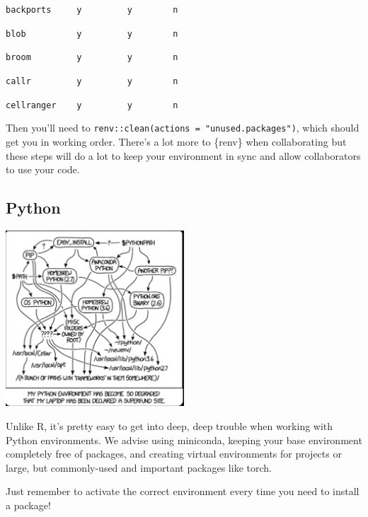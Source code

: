 \documentclass[
  letterpaper,
  DIV=11,
  numbers=noendperiod]{scrreprt}
\begin{document}
\begin{tcolorbox}
\texttt{backports\ \ \ \ \ y\ \ \ \ \ \ \ \ \ y\ \ \ \ \ \ \ \ n}

\texttt{blob\ \ \ \ \ \ \ \ \ \ y\ \ \ \ \ \ \ \ \ y\ \ \ \ \ \ \ \ n}

\texttt{broom\ \ \ \ \ \ \ \ \ y\ \ \ \ \ \ \ \ \ y\ \ \ \ \ \ \ \ n}

\texttt{callr\ \ \ \ \ \ \ \ \ y\ \ \ \ \ \ \ \ \ y\ \ \ \ \ \ \ \ n}

\texttt{cellranger\ \ \ \ y\ \ \ \ \ \ \ \ \ y\ \ \ \ \ \ \ \ n}

Then you'll need to \texttt{renv::clean(actions\ =\ "unused.packages")},
which should get you in working order. There's a lot more to \{renv\}
when collaborating but these steps will do a lot to keep your
environment in sync and allow collaborators to use your code.

\end{tcolorbox}

\subsection{Python}\label{python-1}

\includegraphics[width=0.5\textwidth,height=0.5\textheight]{img/pyenv.png}

Unlike R, it's pretty easy to get into deep, deep trouble when working
with Python environments. We advise using miniconda, keeping your base
environment completely free of packages, and creating virtual
environments for projects or large, but commonly-used and important
packages like torch.

\begin{tcolorbox}[enhanced jigsaw, colback=white, opacitybacktitle=0.6, coltitle=black, left=2mm, breakable, bottomtitle=1mm, toptitle=1mm, toprule=.15mm, colframe=quarto-callout-tip-color-frame, titlerule=0mm, title=\textcolor{quarto-callout-tip-color}{\faLightbulb}\hspace{0.5em}{Tip}, colbacktitle=quarto-callout-tip-color!10!white, rightrule=.15mm, bottomrule=.15mm, arc=.35mm, opacityback=0, leftrule=.75mm]

Just remember to activate the correct environment every time you need to
install a package!

\end{tcolorbox}
\end{document}
